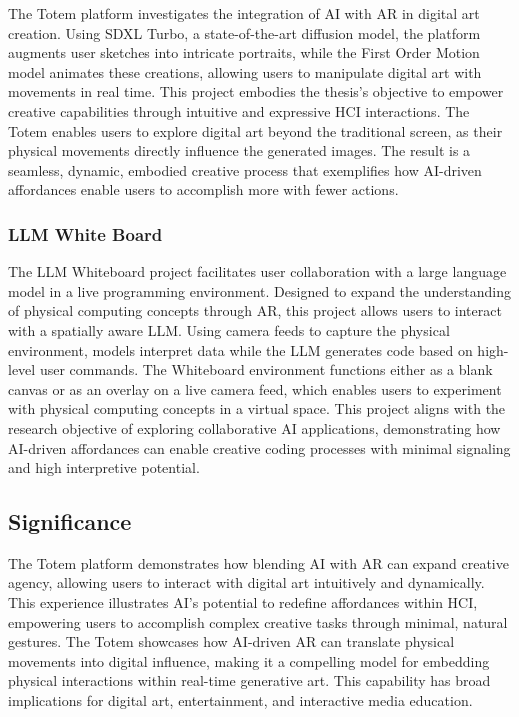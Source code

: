 The Totem platform investigates the integration of AI with AR in digital art creation.
Using SDXL Turbo, a state-of-the-art diffusion model, the platform augments user sketches into intricate portraits, while the First Order Motion model animates these creations, allowing users to manipulate digital art with movements in real time. 
This project embodies the thesis’s objective to empower creative capabilities through intuitive and expressive HCI interactions.
The Totem enables users to explore digital art beyond the traditional screen, as their physical movements directly influence the generated images.
The result is a seamless, dynamic, embodied creative process that exemplifies how AI-driven affordances enable users to accomplish more with fewer actions.

\subsubsection{LLM White Board}

The LLM Whiteboard project facilitates user collaboration with a large language model in a live programming environment.
Designed to expand the understanding of physical computing concepts through AR, this project allows users to interact with a spatially aware LLM.
Using camera feeds to capture the physical environment, models interpret data while the LLM generates code based on high-level user commands.
The Whiteboard environment functions either as a blank canvas or as an overlay on a live camera feed, which enables users to experiment with physical computing concepts in a virtual space. 
This project aligns with the research objective of exploring collaborative AI applications, demonstrating how AI-driven affordances can enable creative coding processes with minimal signaling and high interpretive potential.

\subsection{Significance}

The Totem platform demonstrates how blending AI with AR can expand creative agency, allowing users to interact with digital art intuitively and dynamically.
This experience illustrates AI’s potential to redefine affordances within HCI, empowering users to accomplish complex creative tasks through minimal, natural gestures.
The Totem showcases how AI-driven AR can translate physical movements into digital influence, making it a compelling model for embedding physical interactions within real-time generative art.
This capability has broad implications for digital art, entertainment, and interactive media education.

